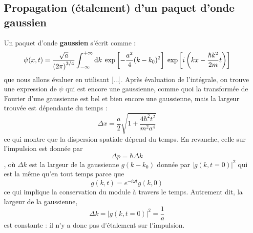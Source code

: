 \subsection{Propagation (étalement) d'un paquet d'onde gaussien}
Un paquet d'onde \textbf{gaussien} s'écrit comme :
\begin{equation}
\psi(x, t) = \dfrac{\sqrt{a}}{\left(2\pi\right) ^{3/4}} \int_{-\infty} ^{+\infty} \mathrm{d} k \; \exp \left[-\dfrac{a^2}{4} (k-k_0)^2\right] \; \exp\left[i \left(kx - \dfrac{\hbar k^2}{2m}t\right)\right]
\end{equation}
que nous allons évaluer en utilisant [...]. Après évaluation de l'intégrale, on trouve une expression de $\psi$ qui est encore une gaussienne, comme quoi la transformée de Fourier d'une gaussienne est bel et bien encore une gaussienne, mais la largeur trouvée est dépendante du temps :
\begin{equation}
\Delta x = \dfrac{a}{2} \sqrt{ 1 + \dfrac{4 \hbar ^2 t^2}{m^2 a^4}}
\end{equation}
ce qui montre que la dispersion spatiale dépend du temps. En revanche, celle sur l'impulsion est donnée par $$\Delta p = \hbar \Delta k$$, où $\Delta k$ est la largeur de la gaussienne $g(k-k_0)$ donnée par $|g(k,t=0)|^2$ qui est la même qu'en tout temps parce que $$g(k,t) = e^{-i\omega t} g(k,0)$$ ce qui implique la conservation du module à travers le temps. Autrement dit, la largeur de la gaussienne, 
$$\Delta k = |g(k,t=0)|^2 = \dfrac{1}{a}$$
est constante : il n'y a donc pas d'étalement sur l'impulsion.



